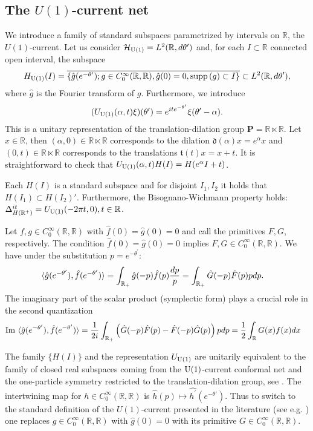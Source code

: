 \documentclass[12pt]{article}
\def\RR{{\mathbb R}}
\def\H{{\mathcal H}}
\def\uone{{\rm U(1)}}
\def\supp{{\rm supp\,}}
\def\im{\mathrm{Im}\,}
\theoremstyle{remark}
\begin{document}
\subsection{The \texorpdfstring{$U(1)$}{U(1)}-current net}\label{sec:U(1)-current}
We introduce a family of standard subspaces parametrized by intervals on $\RR$,
the $U(1)$-current. Let us consider
$\H_{\uone} = L^2(\RR,d\theta')$
and, for each $I \subset \RR$ connected open interval, the subspace
\begin{align*}
 H_\uone(I)=\overline{\{\hat{g}(e^{-\theta'});g\in C_0^\infty(\RR,\RR), \hat g(0) = 0, \supp(g)\subset I\}} \subset L^2(\RR,d\theta'),
\end{align*}
where $\hat g$ is the Fourier transform of $g$.
Furthermore, we introduce
\[
(U_{\uone}(\alpha, t)\xi)(\theta') = e^{it e^{-\theta'}}\xi(\theta'-\alpha). 
\]
This is a unitary representation of the translation-dilation group $\mathbf{P} = \RR \ltimes \RR$. Let $x\in\RR$, then $(\alpha,0)\in \RR\ltimes\RR$ corresponds to the dilation $\mathfrak{d}(\alpha) x =e^{\alpha}x$ and $(0,t)\in \RR\ltimes\RR$ corresponds to the translations $\mathfrak{t}(t)x=x+t$. It is straightforward to check that
$U_{\uone}(\alpha, t) H(I) =  H(e^\alpha I + t)$. 


Each $H(I)$ is a standard subspace
and for disjoint $I_1, I_2$ it holds that $H(I_1) \subset H(I_2)'$.
Furthermore, the Bisognano-Wichmann property holds:
$\Delta_{H(\RR^+)}^{it}=U_{\uone}(-2\pi t,0), t\in\RR$.

Let $f,g \in C_0^\infty(\RR,\RR)$ with $\hat{f}(0)=\hat{g}(0)=0$ and call the primitives $F,G$, respectively. The condition $\hat{f}(0)=\hat{g}(0)=0$ implies $F,G \in C_0^\infty(\RR,\RR)$.  We have under the substitution $p=e^{-\theta^\prime}$:
	\begin{align*}
		\braket{\hat{g}(e^{-\theta^\prime}),\hat{f}(e^{-\theta^\prime})}&=\int_{\RR_+}\hat{g}(-p)\hat{f}(p)\frac{dp}{p}=\int_{\RR_+}\hat{G}(-p)\hat{F}(p)pdp.
	\end{align*}	
The imaginary part of the scalar product (symplectic form) plays a crucial role in the second quantization  
		\begin{align}\label{eq:U(1)-symplectic-form}
			\im\braket{\hat{g}(e^{-\theta^\prime}),\hat{f}(e^{-\theta^\prime})}&=\frac{1}{2i}\int_{\RR_+}\left(\hat{G}(-p)\hat{F}(p)-\hat{F}(-p)\hat{G}(p)\right)pdp=\frac{1}{2}\int_{\RR} G(x)f(x)dx
		\end{align}	
	
The family $\{H(I)\}$ and the representation $U_{\uone}$ are unitarily equivalent to the family of closed real subspaces coming from the $\uone$-current conformal net and the one-particle symmetry restricted to the translation-dilation group, see \cite[Section 5.2]{BT15}. The intertwining map for $h\in C_0^\infty(\RR,\RR)$ is $\hat{h}(p)\mapsto \widehat{h^\prime}(e^{-\theta'})$. Thus to switch to the standard definition of the $U(1)$-current presented in the literature (see e.g. \cite{Longo08}) one replaces $g\in C_0^\infty(\RR,\RR)$ with $\hat{g}(0)=0$ with its primitive $G\in C_0^\infty(\RR,\RR)$.  
\end{document}
